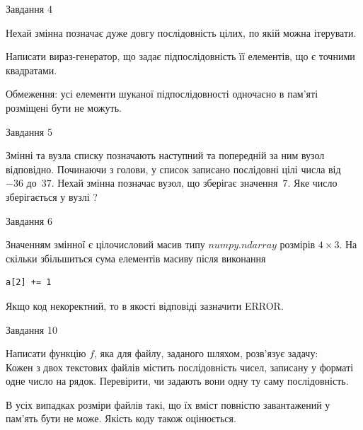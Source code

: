 \documentclass[12pt, ukrainian]{article}
\begin{document}
{               
{\begin{center}Завдання {4}\end{center}}
\vspace{-6mm}
Нехай змінна  позначає дуже довгу послідовність цілих, по якій можна ітерувати.

Написати вираз-генератор, що задає підпослідовність її елементів, що є точними квадратами.

Обмеження: усі елементи шуканої підпослідовності одночасно в пам'яті розміщені бути не можуть.\par

\vspace{10mm}
               
{\begin{center}Завдання {5}\end{center}}
\vspace{-6mm}
Змінні  та  вузла списку позначають наступний та попередній за ним вузол відповідно. Починаючи з голови, у список записано послідовні цілі числа від~$-36$ до~$37$. Нехай змінна  позначає вузол, що зберігає значення~$7$.
Яке число зберігається у вузлі  ?\par

               
{\begin{center}Завдання {6}\end{center}}
\vspace{-6mm}
Значенням змінної  є цілочисловий масив типу $numpy.ndarray$ розмірів $4{\times}3$. На скільки збільшиться сума елементів масиву  після виконання
\begin{verbatim}
a[2] += 1
\end{verbatim}


Якщо код некоректний, то в якості відповіді зазначити ERROR.\par

               
{\begin{center}Завдання {10}\end{center}}
\vspace{-6mm}

Написати функцію $f$, яка для файлу, заданого шляхом, розв’язує задачу:\\ Кожен з двох текстових файлів містить послідовність чисел, записану у форматі одне число на рядок.  Перевірити, чи задають вони одну ту саму послідовність.

В усіх випадках розміри файлів такі, що їх вміст повністю завантажений у пам'ять бути не може. Якість коду також оцінюється.



}
\end{document}
